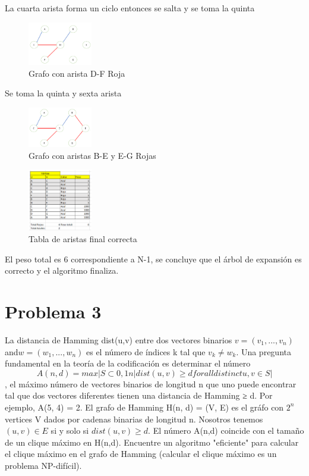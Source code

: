 \documentclass[conference,compsoc]{IEEEtran}
\begin{document}
La cuarta arista forma un ciclo entonces se salta y se toma la quinta

\begin{figure}[h] 
    \centering
    \includegraphics[width=0.25\textwidth]{Problema2/s16.png}
    \caption{Grafo con arista D-F Roja}
    \label{fig:mesh1}
\end{figure}
$$$$
Se toma la quinta y sexta arista

\begin{figure}[h] 
    \centering
    \includegraphics[width=0.25\textwidth]{Problema2/s17.png}
    \caption{Grafo con aristas B-E y E-G Rojas}
    \label{fig:mesh1}
\end{figure}

\begin{figure}[h] 
    \centering
    \includegraphics[width=0.25\textwidth]{Problema2/s18.png}
    \caption{Tabla de aristas final correcta}
    \label{fig:mesh1}
\end{figure}

El peso total es 6 correspondiente a N-1, se concluye que el árbol de expansión es correcto y el algoritmo finaliza.
\section{Problema 3}

La distancia de Hamming dist(u,v) entre dos vectores binarios $v = (v_{1} , . . . , v_{n} ) $and$ w = (w_{1} , . . . , w_{n} )$ es el número de índices k tal que $v_{k} \neq w_k$. Una pregunta fundamental en la teoría de la codificación es determinar el número 
$$A(n, d) = max |{S ⊂ {0, 1} n | dist(u, v) ≥ d for all distinct u, v ∈ S}|$$, 
el máximo número de vectores binarios de longitud n que uno puede encontrar tal que dos vectores diferentes tienen una distancia de Hamming ≥ d.  Por ejemplo, A(5, 4) = 2. 
El grafo de Hamming H(n, d) = (V, E) es el gráfo con $2^{n}$ vertices V dados por cadenas binarias de longitud n. Nosotros tenemos $(u, v) ∈ E$ si y solo si $dist(u, v) ≥ d$. El número A(n,d) coincide con el tamaño de un clique máximo en H(n,d). Encuentre un algoritmo "eficiente"  para calcular el clique máximo en el grafo de Hamming (calcular el clique máximo es un problema NP-difícil).
\end{document}
